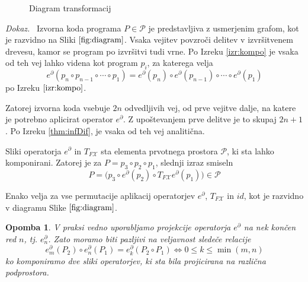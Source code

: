 \documentclass[a4paper, 12pt]{book}
\newcommand{\X}{\mathcal{X}}
\newcommand{\dP}{\mathcal{P}}
\newcommand{\D}{\partial}
\newtheorem{opomba}{Opomba}[chapter]
\newenvironment{dokaz}{\emph{Dokaz.}\ }{\hspace{\fill}{$\Box$}}
\begin{document}
\begin{figure}
\begin{center}
\caption{Diagram transformacij} \label{fig:diagram}
\end{center}
\end{figure}
\begin{dokaz}
	Izvorna koda programa $P\in\dP$ je predstavljiva z usmerjenim grafom, kot je razvidno na Sliki $\ref{fig:diagram}$.
	Vsaka vejitev povzroči delitev v izvršitvenem drevesu, kamor se program po izvršitvi tudi vrne. Po Izreku \ref{izr:kompo} je vsaka od teh vej lahko videna kot program $p_i$, za katerega velja
	$$e^\D(p_n\circ p_{n-1}\circ\cdots\circ p_1)=e^\D(p_n)\circ e^\D(p_{n-1})\circ\cdots\circ e^\D(p_1)$$ po Izreku $\ref{izr:kompo}$.
	
	Zatorej izvorna koda vsebuje $2n$ odvedljivih vej, od prve vejitve dalje, na katere je potrebno aplicirat operator $e^\D$. Z upoštevanjem prve delitve je to skupaj $2n+1$. Po Izreku \ref{thm:infDif}, je vsaka od teh vej analitična.
\end{dokaz}

Sliki operatorja $e^\D$ in $T_{F\X}$  sta elementa prvotnega prostora $\dP$, ki sta lahko komponirani. Zatorej je za $P=p_3\circ p_2\circ p_1$, slednji izraz smiseln
\begin{equation*}\label{trd:composeOperators}
P=\Big(p_3\circ e^ \D(p_2)\circ T_{F\X}e^\D(p_1)\Big) \in \dP
\end{equation*}

Enako velja za vse permutacije aplikacij operatorjev $e^\D$, $T_{F\X}$ in $id$, kot je razvidno v diagramu Slike $\ref{fig:diagram}$.

\begin{opomba}
V praksi vedno uporabljamo projekcije operatorja $e^\D$ na nek končen red $n$, tj. $e^\D_n$. Zato moramo biti pazljivi na veljavnost sledeče relacije
\begin{equation*}
e^\D_m(P_2)\circ e^\D_n(P_1)=e^\D_k(P_2\circ P_1)\iff 0\le k\le \min(m,n)
\end{equation*}
ko komponiramo dve sliki operatorjev, ki sta bila projicirana na različna podprostora.
\end{opomba}
\end{document}
